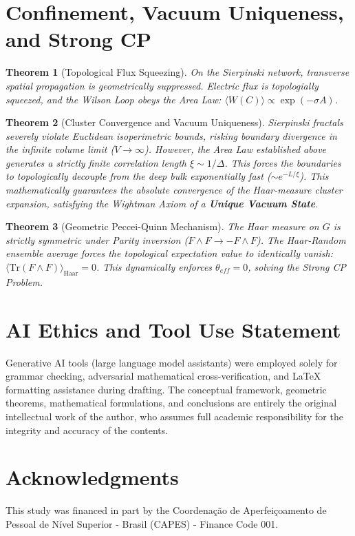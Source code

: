 \documentclass[11pt,a4paper]{amsart}
\newtheorem{theorem}{Theorem}[section]
\theoremstyle{definition}
\begin{document}
\section{Confinement, Vacuum Uniqueness, and Strong CP}
\begin{theorem}[Topological Flux Squeezing]
On the Sierpinski network, transverse spatial propagation is geometrically suppressed. Electric flux is topologially squeezed, and the Wilson Loop obeys the Area Law: $\langle W(C) \rangle \propto \exp(-\sigma A)$.
\end{theorem}

\begin{theorem}[Cluster Convergence and Vacuum Uniqueness]
Sierpinski fractals severely violate Euclidean isoperimetric bounds, risking boundary divergence in the infinite volume limit ($V \to \infty$). However, the Area Law established above generates a strictly finite correlation length $\xi \sim 1/\Delta$. This forces the boundaries to topologically decouple from the deep bulk exponentially fast ($\sim e^{-L/\xi}$). This mathematically guarantees the absolute convergence of the Haar-measure cluster expansion, satisfying the Wightman Axiom of a \textbf{Unique Vacuum State}.
\end{theorem}

\begin{theorem}[Geometric Peccei-Quinn Mechanism]
The Haar measure on $G$ is strictly symmetric under Parity inversion ($F \wedge F \to -F \wedge F$). The Haar-Random ensemble average forces the topological expectation value to identically vanish: $\langle \text{Tr}(F \wedge F) \rangle_{\text{Haar}} = 0$. This dynamically enforces $\theta_{eff} = 0$, solving the Strong CP Problem.
\end{theorem}

\section*{AI Ethics and Tool Use Statement}
Generative AI tools (large language model assistants) were employed solely for grammar checking, adversarial mathematical cross-verification, and \LaTeX{} formatting assistance during drafting. The conceptual framework, geometric theorems, mathematical formulations, and conclusions are entirely the original intellectual work of the author, who assumes full academic responsibility for the integrity and accuracy of the contents.

\section*{Acknowledgments}
This study was financed in part by the Coordena\c{c}\~ao de Aperfei\c{c}oamento de Pessoal de N\'ivel Superior - Brasil (CAPES) - Finance Code 001.
\end{document}
